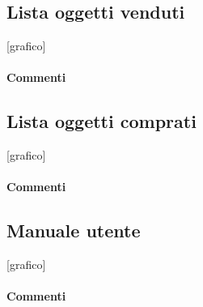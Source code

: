 \documentclass[a4paper, 12pt]{article}
\begin{document}
\subsection{Lista oggetti venduti}
[grafico]
\paragraph{Commenti}

\subsection{Lista oggetti comprati}
[grafico]
\paragraph{Commenti}

\subsection{Manuale utente}
[grafico]
\paragraph{Commenti}
\end{document}
